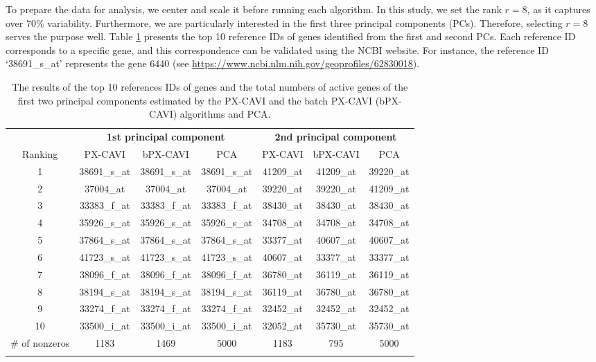 \documentclass[pdftex, noinfoline, letter]{imsart}
\theoremstyle{plain}
\begin{document}
To prepare the data for analysis, we center and scale it before running each algorithm. In this study, we set the rank $r = 8$, as it captures over $70\%$ variability. Furthermore, we are particularly interested in the first three principal components (PCs). Therefore, selecting $r = 8$ serves the purpose well.
Table \ref{real-1} presents the top 10 reference IDs of genes identified from the first and second PCs. Each reference ID corresponds to a specific gene, and this correspondence can be validated using the NCBI website. For instance, the reference ID `38691\_s\_at' represents the gene 6440 (see \url{https://www.ncbi.nlm.nih.gov/geoprofiles/62830018}).
\begin{table}[h]
\begin{adjustwidth}{-.5in}{-.5in}  
\centering
\caption{\small The results of the top 10 references IDs of genes and the total numbers of active genes of the first two principal components estimated by the PX-CAVI and the batch PX-CAVI (bPX-CAVI) algorithms and PCA.}
\label{real-1}
{ \small
\begin{tabular}{c|ccc||ccc}
\Xhline{2\arrayrulewidth}
 &
\multicolumn{3}{c||}{\bf 1st principal component} & 
\multicolumn{3}{c}{\bf 2nd principal component} \\
\Xhline{2\arrayrulewidth}
Ranking & PX-CAVI & bPX-CAVI & PCA & PX-CAVI & bPX-CAVI & PCA \\
\Xhline{2\arrayrulewidth}
1 & 38691\_s\_at & 38691\_s\_at & 38691\_s\_at & 41209\_at & 41209\_at & 39220\_at\\
2 & 37004\_at & 37004\_at & 37004\_at & 39220\_at & 39220\_at & 41209\_at\\
3 & 33383\_f\_at & 33383\_f\_at & 33383\_f\_at & 38430\_at & 38430\_at & 38430\_at\\
4 & 35926\_s\_at & 35926\_s\_at & 35926\_s\_at & 34708\_at & 34708\_at & 34708\_at\\
5 & 37864\_s\_at & 37864\_s\_at & 37864\_s\_at & 33377\_at & 40607\_at & 40607\_at \\
6 & 41723\_s\_at & 41723\_s\_at & 41723\_s\_at & 40607\_at & 33377\_at & 33377\_at \\
7 & 38096\_f\_at & 38096\_f\_at & 38096\_f\_at & 36780\_at & 36119\_at & 36119\_at\\
8 & 38194\_s\_at & 38194\_s\_at & 38194\_s\_at & 36119\_at & 36780\_at & 36780\_at\\
9 & 33274\_f\_at & 33274\_f\_at & 33274\_f\_at & 32452\_at & 32452\_at & 32452\_at \\
10 & 33500\_i\_at & 33500\_i\_at & 33500\_i\_at & 32052\_at & 35730\_at & 35730\_at\\
\hline
\# of nonzeros & 1183 & 1469 & 5000 & 1183 & 795 & 5000\\
\Xhline{2\arrayrulewidth}
\end{tabular}    
}
\end{adjustwidth}
\end{table}
\end{document}
